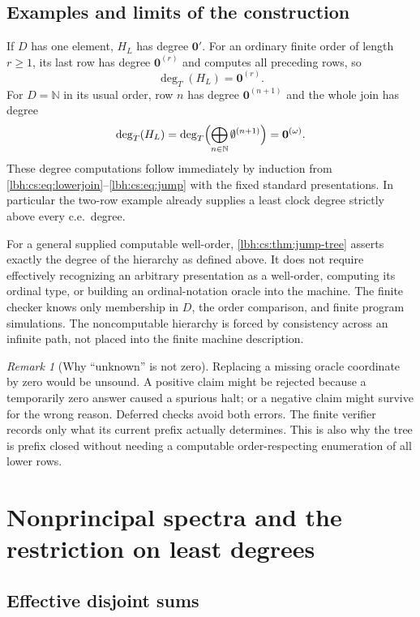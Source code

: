 \documentclass[11pt,letterpaper]{article}
\theoremstyle{definition}
\theoremstyle{remark}
\newtheorem{remark}[theorem]{Remark}
\newcommand{\N}{\mathbb N}
\newcommand{\1}{\mathbf 1}
\newcommand{\csdegT}{\operatorname{deg}_{T}}
\newcommand{\cszero}{\mathbf 0}
\newcommand{\srctag}[1]{\texorpdfstring{\hspace{0.4em}{\normalfont\small\color{accent}[source #1]}}{ [source #1]}}
\begin{document}
\subsection{Examples and limits of the construction}
If $D$ has one element, $H_L$ has degree $\cszero'$. For an ordinary finite
order of length $r\geq1$, its last row has degree $\cszero^{(r)}$ and computes
all preceding rows, so
\[
 \csdegT(H_L)=\cszero^{(r)}.
\]
For $D=\N$ in its usual order, row $n$ has degree $\cszero^{(n+1)}$ and the
whole join has degree
\[
 \csdegT(H_L)=\csdegT\Bigl(\bigoplus_{n\in\N}\emptyset^{(n+1)}\Bigr)
 =\cszero^{(\omega)}.
\]
These degree computations follow immediately by induction from
\eqref{lbh:cs:eq:lowerjoin}--\eqref{lbh:cs:eq:jump} with the fixed standard presentations.
In particular the two-row example already supplies a least clock degree
strictly above every c.e.\ degree.

For a general supplied computable well-order, \cref{lbh:cs:thm:jump-tree}
asserts exactly the degree of the hierarchy as defined above. It does not
require effectively recognizing an arbitrary presentation as a well-order,
computing its ordinal type, or building an ordinal-notation oracle into
the machine. The finite checker knows only membership in $D$, the order
comparison, and finite program simulations. The noncomputable hierarchy
is forced by consistency across an infinite path, not placed into the
finite machine description.

\begin{remark}[Why ``unknown'' is not zero]
Replacing a missing oracle coordinate by zero would be unsound. A
positive claim might be rejected because a temporarily zero answer caused
a spurious halt; or a negative claim might survive for the wrong reason.
Deferred checks avoid both errors. The finite verifier records only what
its current prefix actually determines. This is also why the tree is
prefix closed without needing a computable order-respecting enumeration
of all lower rows.
\end{remark}

\section{Nonprincipal spectra and the restriction on least degrees\srctag{12}}\label{lbh:cs:sec:nonprincipal}

\subsection{Effective disjoint sums}
\end{document}
